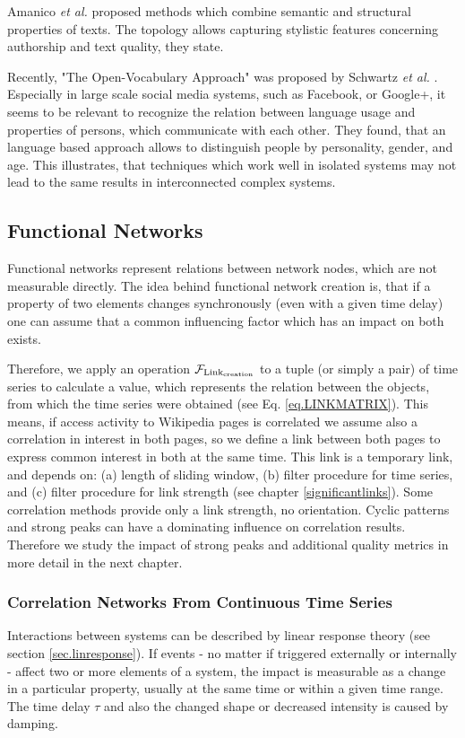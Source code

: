 \documentclass[a4paper,10pt]{scrbook}
\begin{document}
Amanico \textit{et al.} \cite{Amanico2013} proposed methods which combine semantic and structural properties of texts. The topology allows capturing stylistic features concerning authorship and text quality, they state.

Recently, "The Open-Vocabulary Approach" was proposed by Schwartz \textit{et al.} \cite{Schwartz2013}. Especially in large scale social media systems, such as Facebook, or Google+, it seems to be relevant to recognize the relation between language usage and properties of persons, which communicate with each other. They found, that an language based approach allows to distinguish people by personality, gender, and age. This illustrates, that techniques which work well in isolated systems may not lead to the same results in interconnected complex systems. 

 

\subsection{Functional Networks}
Functional networks represent relations between network nodes, which are not measurable directly. The idea behind functional network creation is, that if a property of two elements changes synchronously (even with a given time delay) one can assume that a common influencing factor which has an impact on both exists. 

Therefore, we apply an operation $\mathcal{F}_{\rm {Link}_{\rm {creation}}}$ to a tuple (or simply a pair) of time series to calculate a value, which represents the relation between the objects, from which the time series were obtained (see Eq. \ref{eq.LINKMATRIX}). This means, if access activity to Wikipedia pages is correlated we assume also a correlation in interest in both pages, so we define a link between both pages to express common interest in both at the same time. This link is a temporary link, and depends on: (a) length of sliding window, (b) filter procedure for time series, and (c) filter procedure for link strength (see chapter \ref{significantlinks}). Some correlation methods provide only a link strength, no orientation. Cyclic patterns and strong peaks can have a dominating influence on correlation results. Therefore we study the impact of strong peaks and additional quality metrics in more detail in the next chapter. 

\subsubsection{Correlation Networks From Continuous Time Series}
Interactions between systems can be described by linear response theory (see section \ref{sec.linresponse}). If events - no matter if triggered externally or internally - affect two or more elements of a system, the impact is measurable as a change in a particular property, usually at the same time or within a given time range. The time delay $\tau$ and also the changed shape or decreased intensity is caused by damping. 
\end{document}
